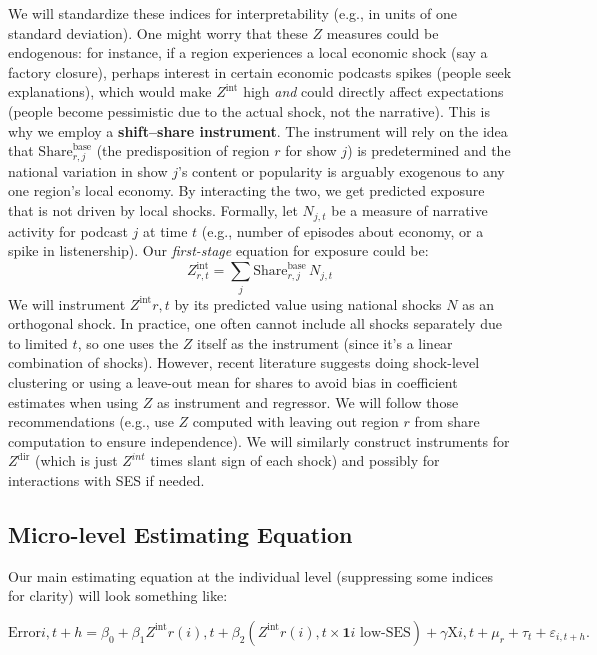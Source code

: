 \documentclass[12pt]{article}
\begin{document}
We will standardize these indices for interpretability (e.g., in units of one standard deviation).
One might worry that these $Z$ measures could be endogenous: for instance, if a region experiences a local economic shock (say a factory closure), perhaps interest in certain economic podcasts spikes (people seek explanations), which would make $Z^{\text{int}}$ high \emph{and} could directly affect expectations (people become pessimistic due to the actual shock, not the narrative). This is why we employ a \textbf{shift–share instrument}. The instrument will rely on the idea that $\text{Share}_{r,j}^{\text{base}}$ (the predisposition of region $r$ for show $j$) is predetermined and the national variation in show $j$'s content or popularity is arguably exogenous to any one region's local economy. By interacting the two, we get predicted exposure that is not driven by local shocks.
Formally, let $N_{j,t}$ be a measure of narrative activity for podcast $j$ at time $t$ (e.g., number of episodes about economy, or a spike in listenership). Our \emph{first-stage} equation for exposure could be:
$$
    Z_{r,t}^\text{int} = \sum_j \text{Share}_{r,j}^\text{base} \, N_{j,t}
$$
We will instrument $Z^{\text{int}}{r,t}$ by its predicted value using national shocks $N$ as an orthogonal shock. In practice, one often cannot include all shocks separately due to limited $t$, so one uses the $Z$ itself as the instrument (since it's a linear combination of shocks). However, recent literature suggests doing shock-level clustering or using a leave-out mean for shares to avoid bias in coefficient estimates when using $Z$ as instrument and regressor. We will follow those recommendations (e.g., use $Z$ computed with leaving out region $r$ from share computation to ensure independence).
We will similarly construct instruments for $Z^{\text{dir}}$ (which is just $Z^{int}$ times slant sign of each shock) and possibly for interactions with SES if needed.
\subsection{Micro-level Estimating Equation}
Our main estimating equation at the individual level (suppressing some indices for clarity) will look something like:

\begin{equation}
    \label{eq:main}
    \text{Error}{i,t+h} = \beta_0 + \beta_1 Z^{\text{int}}{r(i),t} + \beta_2 \left(Z^{\text{int}}{r(i),t} \times \mathbf{1}{i\text{ low-SES}}\right) + \gamma \text{X}{i,t} + \mu_r + \tau_t + \varepsilon_{i,t+h}.
\end{equation}
\end{document}
